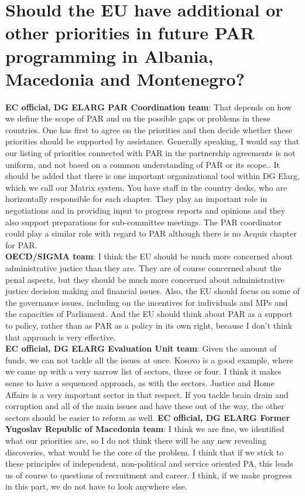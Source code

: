 \section{Should the EU have additional or other priorities in future PAR programming in Albania, Macedonia and Montenegro?}
\textbf{EC official, DG ELARG PAR Coordination team}: That depends on  how we define the scope of PAR and  on the possible gaps or problems in these countries. One has first to agree on the priorities and then decide whether these priorities should be supported by assistance. Generally speaking, I would say that our listing  of priorities connected with PAR in the partnership agreements is not uniform, and  not based on a common understanding of PAR or its scope.. It should be added that there is one important organizational tool within DG Elarg, which we call our Matrix system. You have staff in the  country desks, who are horizontally responsible for each chapter. They play an important role in negotiations and in providing input to progress reports and opinions and they also support preparations for sub-committee meetings. The PAR coordinator could play a similar role with regard to PAR  although there is no Acquis chapter for PAR.\\
\textbf{OECD/SIGMA team}: I think the EU should be much more concerned about administrative justice than they are. They are of course concerned about the penal aspects, but they should be much more concerned about administrative justice decision making and financial issues. Also, the EU should focus on some of the governance issues, including on the incentives for individuals and MPs and the capacities of Parliament. And the EU should think about PAR as a support to policy, rather than as PAR as a policy in its own right, because I don't think that approach is very effective.\\
\textbf{EC official, DG ELARG Evaluation Unit team}: Given the amount of funds, we can not tackle all the issues at once. Kosovo is a good example, where we came up with a very narrow list of sectors, three or four. I think it makes sense to have a sequenced approach, as with the sectors. Justice and Home Affairs is a very important sector in that respect. If you tackle brain drain and corruption and all of the main issues and have these out of the way, the other sectors should be easier to reform as well.
\textbf{EC official, DG ELARG Former Yugoslav Republic of Macedonia team}: I think we are fine, we identified what our priorities are, so I do not think there will be any new revealing discoveries, what would be the core of the problem. I think that if we stick to these principles of independent, non-political and service oriented PA, this leads us of course to questions of recruitment and career. I think, if we make progress in this part, we do not have to look anywhere else.\\
